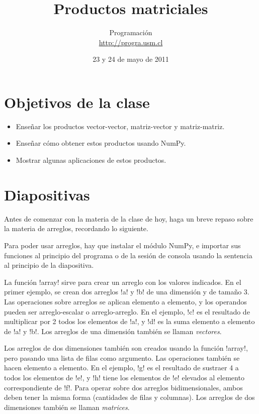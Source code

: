 \documentclass[10pt]{article}
\title{Productos matriciales}
\author{Programación \\ \url{http://progra.usm.cl}}
\date{23 y 24 de mayo de 2011}
\begin{document}
  \maketitle

  \section*{Objetivos de la clase}
  \begin{itemize}
    \item Enseñar los productos
      vector-vector, matriz-vector y matriz-matriz.
    \item Enseñar cómo obtener estos productos usando NumPy.
    \item Mostrar algunas aplicaciones de estos productos.
  \end{itemize}

  \section*{Diapositivas}


  Antes de comenzar con la materia de la clase de hoy,
  haga un breve repaso sobre la materia de arreglos,
  recordando lo siguiente.

  Para poder usar arreglos,
  hay que instalar el módulo NumPy,
  e importar sus funciones al principio del programa
  o de la sesión de consola
  usando la sentencia al principio de la diapositiva.

  La función \li!array! sirve para crear un arreglo
  con los valores indicados.
  En el primer ejemplo,
  se crean dos arreglos \li!a! y \li!b! de una dimensión y de tamaño 3.
  Las operaciones sobre arreglos se aplican elemento a elemento,
  y los operandos pueden ser arreglo-escalar o arreglo-arreglo.
  En el ejemplo,
  \li!c! es el resultado de multiplicar por 2 todos los elementos de \li!a!,
  y \li!d! es la suma elemento a elemento de \li!a! y \li!b!.
  Los arreglos de una dimensión también se llaman \emph{vectores}.

  Los arreglos de dos dimensiones
  también son creados usando la función \li!array!,
  pero pasando una lista de filas como argumento.
  Las operaciones también se hacen elemento a elemento.
  En el ejemplo,
  \li!g! es el resultado de sustraer 4 a todos los elementos de \li!e!,
  y  \li!h! tiene los elementos de \li!e!
  elevados al elemento correspondiente de \li!f!.
  Para operar sobre dos arreglos bidimensionales,
  ambos deben tener la misma forma (cantidades de filas y columnas).
  Los arreglos de dos dimensiones también se llaman \emph{matrices}.
\end{document}
